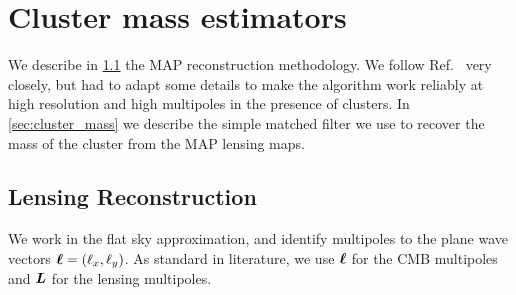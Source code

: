 \documentclass[prd, superscriptaddress, tightenlines, longbibliography, nofootinbib, eqsecnum, amsfonts, amsmath, floatfix, twocolumn, notitlepage]{revtex4-2}
\begin{document}
 


\section{Cluster mass estimators}
\label{sec:method}
We describe in \ref{sec:estimators} the MAP reconstruction methodology. We follow  Ref.~\cite{Carron:2017mqf} very closely, but had to adapt some details to make the algorithm work reliably at high resolution and high multipoles in the presence of clusters.
In \ref{sec:cluster_mass} we describe the simple matched filter we use to recover the mass of the cluster from the MAP lensing maps.

\subsection{Lensing Reconstruction}
\label{sec:estimators}


We work in the flat sky approximation, and identify multipoles to the plane wave vectors ${\boldsymbol{\ell}} = (\ell_x, \ell_y)$.
As standard in literature, we use ${\boldsymbol{\ell}}$ for the CMB multipoles and ${\mbox{\boldmath{$L$}}}$ for the lensing multipoles.   
\end{document}
